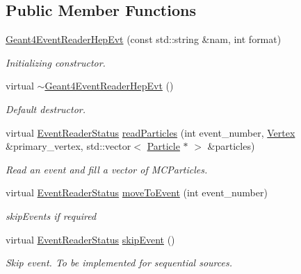 \subsection*{Public Member Functions}
\begin{DoxyCompactItemize}
\item 
\hyperlink{class_d_d4hep_1_1_simulation_1_1_geant4_event_reader_hep_evt_a9f54306f8cbb584efb6a1e1e511d6f1e}{Geant4EventReaderHepEvt} (const std::string \&nam, int format)
\begin{DoxyCompactList}\small\item\em Initializing constructor. \item\end{DoxyCompactList}\item 
virtual \hyperlink{class_d_d4hep_1_1_simulation_1_1_geant4_event_reader_hep_evt_a76273635b29ccc9d9977327da6d6d32d}{$\sim$Geant4EventReaderHepEvt} ()
\begin{DoxyCompactList}\small\item\em Default destructor. \item\end{DoxyCompactList}\item 
virtual \hyperlink{class_d_d4hep_1_1_simulation_1_1_geant4_event_reader_ae4f4bc83ffcf5b0c1868ad78859851e7}{EventReaderStatus} \hyperlink{class_d_d4hep_1_1_simulation_1_1_geant4_event_reader_hep_evt_a33f1a507c2567df42f14616d6724727a}{readParticles} (int event\_\-number, \hyperlink{class_d_d4hep_1_1_simulation_1_1_geant4_vertex}{Vertex} \&primary\_\-vertex, std::vector$<$ \hyperlink{class_d_d4hep_1_1_simulation_1_1_geant4_particle}{Particle} $\ast$ $>$ \&particles)
\begin{DoxyCompactList}\small\item\em Read an event and fill a vector of MCParticles. \item\end{DoxyCompactList}\item 
virtual \hyperlink{class_d_d4hep_1_1_simulation_1_1_geant4_event_reader_ae4f4bc83ffcf5b0c1868ad78859851e7}{EventReaderStatus} \hyperlink{class_d_d4hep_1_1_simulation_1_1_geant4_event_reader_hep_evt_a9e8bf8ad3882ab62d481c6020b9adaed}{moveToEvent} (int event\_\-number)
\begin{DoxyCompactList}\small\item\em skipEvents if required \item\end{DoxyCompactList}\item 
virtual \hyperlink{class_d_d4hep_1_1_simulation_1_1_geant4_event_reader_ae4f4bc83ffcf5b0c1868ad78859851e7}{EventReaderStatus} \hyperlink{class_d_d4hep_1_1_simulation_1_1_geant4_event_reader_hep_evt_a643c4f3e44964b0a5692b5b169ada9e6}{skipEvent} ()
\begin{DoxyCompactList}\small\item\em Skip event. To be implemented for sequential sources. \item\end{DoxyCompactList}\end{DoxyCompactItemize}
